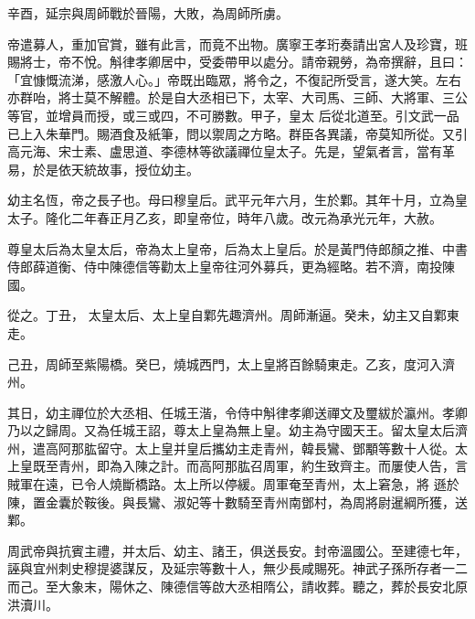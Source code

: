 \begin{pinyinscope}
 辛酉，延宗與周師戰於晉陽，大敗，為周師所虜。



 帝遣募人，重加官賞，雖有此言，而竟不出物。廣寧王孝珩奏請出宮人及珍寶，班賜將士，帝不悅。斛律孝卿居中，受委帶甲以處分。請帝親勞，為帝撰辭，且曰：「宜慷慨流涕，感激人心。」帝既出臨眾，將令之，不復記所受言，遂大笑。左右亦群咍，將士莫不解體。於是自大丞相已下，太宰、大司馬、三師、大將軍、三公等官，並增員而授，或三或四，不可勝數。甲子，皇太
 后從北道至。引文武一品已上入朱華門。賜酒食及紙筆，問以禦周之方略。群臣各異議，帝莫知所從。又引高元海、宋士素、盧思道、李德林等欲議禪位皇太子。先是，望氣者言，當有革易，於是依天統故事，授位幼主。



 幼主名恆，帝之長子也。母曰穆皇后。武平元年六月，生於鄴。其年十月，立為皇太子。隆化二年春正月乙亥，即皇帝位，時年八歲。改元為承光元年，大赦。



 尊皇太后為太皇太后，帝為太上皇帝，后為太上皇后。於是黃門侍郎顏之推、中書侍郎薛道衡、侍中陳德信等勸太上皇帝往河外募兵，更為經略。若不濟，南投陳國。



 從之。丁丑，
 太皇太后、太上皇自鄴先趣濟州。周師漸逼。癸未，幼主又自鄴東走。



 己丑，周師至紫陽橋。癸巳，燒城西門，太上皇將百餘騎東走。乙亥，度河入濟州。



 其日，幼主禪位於大丞相、任城王湝，令侍中斛律孝卿送禪文及璽紱於瀛州。孝卿乃以之歸周。又為任城王詔，尊太上皇為無上皇。幼主為守國天王。留太皇太后濟州，遣高阿那肱留守。太上皇并皇后攜幼主走青州，韓長鸞、鄧顒等數十人從。太上皇既至青州，即為入陳之計。而高阿那肱召周軍，約生致齊主。而屢使人告，言賊軍在遠，已令人燒斷橋路。太上所以停緩。周軍奄至青州，太上窘急，將
 遜於陳，置金囊於鞍後。與長鸞、淑妃等十數騎至青州南鄧村，為周將尉暹綱所獲，送鄴。



 周武帝與抗賓主禮，并太后、幼主、諸王，俱送長安。封帝溫國公。至建德七年，誣與宜州刺史穆提婆謀反，及延宗等數十人，無少長咸賜死。神武子孫所存者一二而己。至大象末，陽休之、陳德信等啟大丞相隋公，請收葬。聽之，葬於長安北原洪瀆川。




\end{pinyinscope}
